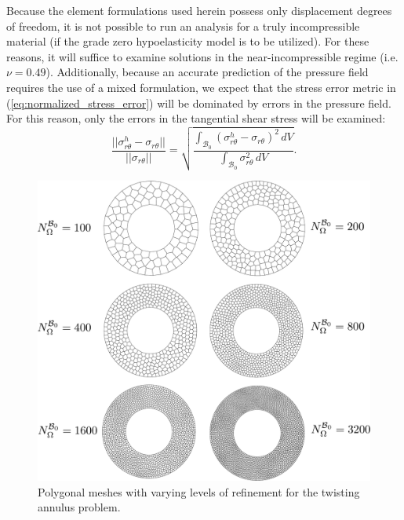Because the element formulations used herein possess only displacement degrees of freedom, it is not possible to run an analysis for a truly incompressible material (if the grade zero hypoelasticity model is to be utilized). For these reasons, it will suffice to examine solutions in the near-incompressible regime (i.e. $\nu = 0.49$). Additionally, because an accurate prediction of the pressure field requires the use of a mixed formulation, we expect that the stress error metric in (\ref{eq:normalized_stress_error}) will be dominated by errors in the pressure field. For this reason, only the errors in the tangential shear stress will be examined:
\begin{equation}
	\frac{||\sigma_{r \theta}^h - \sigma_{r \theta}||}{||\sigma_{r \theta}||} = \sqrt{\frac{\int_{\mathcal{B}_0} (\sigma_{r \theta}^h - \sigma_{r \theta})^2 \, dV}{\int_{\mathcal{B}_0} \sigma_{r \theta}^2 \, dV}}.
	\label{eq:normalized_stress_error}
\end{equation}

\begin{figure}[!h]
  \centering
  \includegraphics[width=6.0in]{figures/annulus_meshes.pdf}
  \caption{Polygonal meshes with varying levels of refinement for the twisting annulus problem.}
  \label{fig:annulus_meshes}
\end{figure}

